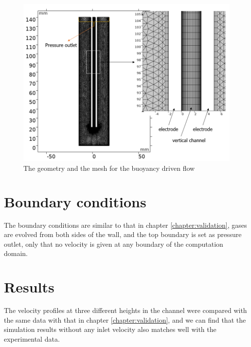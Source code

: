 \begin{figure}[H]
    \centering
    \includegraphics[scale=0.8]{naturalchannel.png}
    \caption{The geometry and the mesh for the buoyancy driven flow}
    \label{naturalchannel}
\end{figure}

\section*{Boundary conditions}

The boundary conditions are similar to that in chapter \ref{chapter:validation}, gases are evolved from both sides of the wall, and the top boundary is set as pressure outlet, only that no velocity is given at any boundary of the computation domain.

\section*{Results}

The velocity profiles at three different heights in the channel were compared with the same data with that in chapter \ref{chapter:validation}, and we can find that the simulation results without any inlet velocity also matches well with the experimental data.


